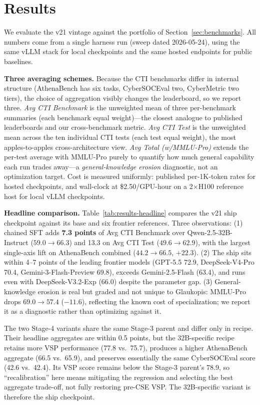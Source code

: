 \documentclass[conference]{IEEEtran}
\begin{document}
\section{Results}
\label{sec:results}

We evaluate the v21 vintage against the portfolio of Section~\ref{sec:benchmarks}. All numbers come from a single harness run (sweep dated 2026-05-24), using the same vLLM stack for local checkpoints and the same hosted endpoints for public baselines.

\textbf{Three averaging schemes.} Because the CTI benchmarks differ in internal structure (AthenaBench has six tasks, CyberSOCEval two, CyberMetric two tiers), the choice of aggregation visibly changes the leaderboard, so we report three. \emph{Avg CTI Benchmark} is the unweighted mean of three per-benchmark summaries (each benchmark equal weight)---the closest analogue to published leaderboards and our cross-benchmark metric. \emph{Avg CTI Test} is the unweighted mean across the ten individual CTI tests (each test equal weight), the most apples-to-apples cross-architecture view. \emph{Avg Total (w/MMLU-Pro)} extends the per-test average with MMLU-Pro \cite{wang2024mmlupro} purely to quantify how much general capability each run trades away---a \textit{general-knowledge erosion} diagnostic, not an optimization target. Cost is measured uniformly: published per-1K-token rates for hosted checkpoints, and wall-clock at \$2.50/GPU-hour on a 2$\times$H100 reference host for local vLLM checkpoints.

\textbf{Headline comparison.} Table~\ref{tab:results-headline} compares the v21 ship checkpoint against its base and six frontier references. Three observations: (1) chained SFT adds \textbf{7.3 points} of Avg CTI Benchmark over Qwen-2.5-32B-Instruct ($59.0\to66.3$) and 13.3 on Avg CTI Test ($49.6\to62.9$), with the largest single-axis lift on AthenaBench combined ($44.2\to66.5$, $+22.3$). (2) The ship sits within 4--7 points of the leading frontier models (GPT-5.5 72.9, DeepSeek-V4-Pro 70.4, Gemini-3-Flash-Preview 69.8), exceeds Gemini-2.5-Flash (63.4), and runs even with DeepSeek-V3.2-Exp (66.0) despite the parameter gap. (3) General-knowledge erosion is real but graded and not unique to Glaukopis: MMLU-Pro drops $69.0\to57.4$ ($-11.6$), reflecting the known cost of specialization; we report it as a diagnostic rather than optimizing against it.

The two Stage-4 variants share the same Stage-3 parent and differ only in recipe. Their headline aggregates are within 0.5 points, but the 32B-specific recipe retains more VSP performance (77.8 vs.\ 75.7), produces a higher AthenaBench aggregate (66.5 vs.\ 65.9), and preserves essentially the same CyberSOCEval score (42.6 vs.\ 42.4). Its VSP score remains below the Stage-3 parent's 78.9, so ``recalibration'' here means mitigating the regression and selecting the best aggregate trade-off, not fully restoring pre-CSE VSP. The 32B-specific variant is therefore the ship checkpoint.
\end{document}

